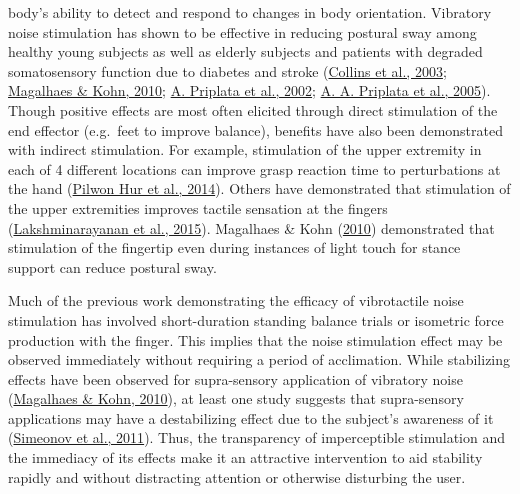 \documentclass[]{cik}%
\begin{document}
body's ability to detect and respond to changes in body orientation.
Vibratory noise stimulation has shown to be effective in reducing
postural sway among healthy young subjects as well as elderly subjects
and patients with degraded somatosensory function due to diabetes and
stroke (\protect\hyperlink{ref-Collins2003}{Collins et al., 2003};
\protect\hyperlink{ref-magalhuxe3es2011}{Magalhaes \& Kohn, 2010};
\protect\hyperlink{ref-Priplata2002}{A. Priplata et al., 2002};
\protect\hyperlink{ref-Priplata2006}{A. A. Priplata et al., 2005}).
Though positive effects are most often elicited through direct
stimulation of the end effector (e.g.~feet to improve balance), benefits
have also been demonstrated with indirect stimulation. For example,
stimulation of the upper extremity in each of 4 different locations can
improve grasp reaction time to perturbations at the hand
(\protect\hyperlink{ref-Hur2014}{Pilwon Hur et al., 2014}). Others have
demonstrated that stimulation of the upper extremities improves tactile
sensation at the fingers
(\protect\hyperlink{ref-Lakshminarayanan2015}{Lakshminarayanan et al.,
2015}). Magalhaes \& Kohn
(\protect\hyperlink{ref-magalhuxe3es2011}{2010}) demonstrated that
stimulation of the fingertip even during instances of light touch for
stance support can reduce postural sway.

Much of the previous work demonstrating the efficacy of vibrotactile
noise stimulation has involved short-duration standing balance trials or
isometric force production with the finger. This implies that the noise
stimulation effect may be observed immediately without requiring a
period of acclimation. While stabilizing effects have been observed for
supra-sensory application of vibratory noise
(\protect\hyperlink{ref-magalhuxe3es2011}{Magalhaes \& Kohn, 2010}), at
least one study suggests that supra-sensory applications may have a
destabilizing effect due to the subject's awareness of it
(\protect\hyperlink{ref-Simeonov2011}{Simeonov et al., 2011}). Thus, the
transparency of imperceptible stimulation and the immediacy of its
effects make it an attractive intervention to aid stability rapidly and
without distracting attention or otherwise disturbing the user.
\end{document}
